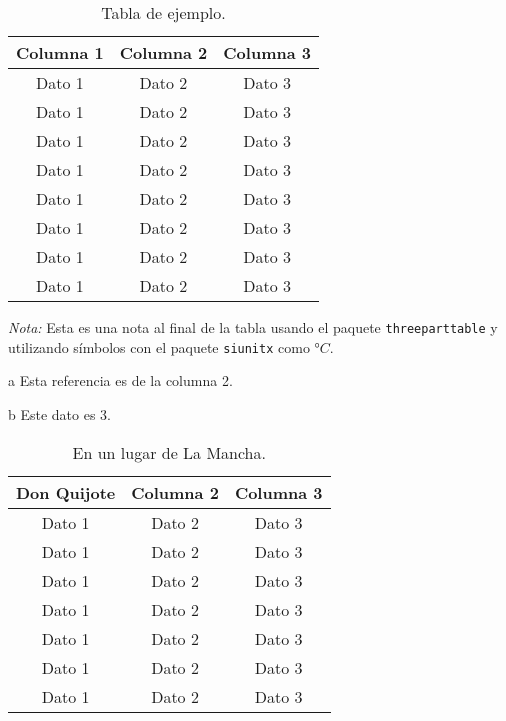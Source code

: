 \begin{table}[!ht]
  \caption{Tabla de ejemplo.}
  \centering
  \begin{threeparttable}
  \begin{tabular}{ccc}

    \toprule
    \textbf{Columna 1} & \textbf{Columna 2}\tnote{a} & \textbf{Columna 3}\\
    \midrule
    Dato 1             & Dato 2             & Dato 3\\
    Dato 1             & Dato 2             & Dato 3\\
    Dato 1             & Dato 2             & Dato 3\\
    Dato 1             & Dato 2             & Dato 3\\
    Dato 1             & Dato 2             & Dato 3\\
    Dato 1             & Dato 2             & Dato 3\\
    Dato 1             & Dato 2             & Dato 3\\
    Dato 1             & Dato 2             & Dato 3\tnote{b}\\
    \bottomrule

  \end{tabular}
  \begin{tablenotes}
    \item \emph{Nota:} Esta es una nota al final de la tabla usando el paquete {\small\texttt{threeparttable}} y utilizando símbolos con el paquete {\small\verb|siunitx|} como \si{\degree}$C$.
    \item [a] Esta referencia es de la columna 2.
    \item [b] Este dato es 3.
  \end{tablenotes}
  \end{threeparttable}
  \label{tab:ejemplo4}
  \end{table}


\begin{table}[!ht]
  \caption{En un lugar de La Mancha.}
  \centering
  \begin{tabular}{ccc}

  \toprule
  \textbf{Don Quijote} & \textbf{Columna 2} & \textbf{Columna 3}\\
  \midrule
  Dato 1             & Dato 2             & Dato 3\\
  Dato 1             & Dato 2             & Dato 3\\
  Dato 1             & Dato 2             & Dato 3\\
  Dato 1             & Dato 2             & Dato 3\\
  Dato 1             & Dato 2             & Dato 3\\
  Dato 1             & Dato 2             & Dato 3\\
  Dato 1             & Dato 2             & Dato 3\\
  \bottomrule

  \end{tabular}
  \label{tab:quijote}
\end{table}


